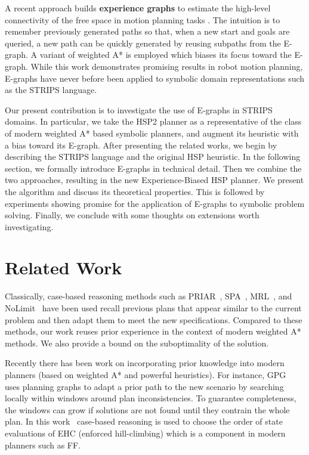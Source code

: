\documentclass[letterpaper]{article}
\begin{document}
A recent approach builds \textbf{experience graphs} to estimate the high-level connectivity of the free space in motion planning tasks \cite{phillips2012graphs}.
The intuition is to remember previously generated paths so that, when a new start and goals are queried, a new path can be quickly generated by reusing subpaths from the E-graph.
A variant of weighted A* is employed which biases its focus toward the E-graph.
While this work demonstrates promising results in robot motion planning, E-graphs have never before been applied to symbolic domain representations such as the STRIPS language.

Our present contribution is to investigate the use of E-graphs in STRIPS domains. In particular, we take the HSP2 planner \cite{bonet2001planning} as a representative of the class of modern weighted A* based symbolic planners, and augment its heuristic with a bias toward its E-graph. After presenting the related works, we begin by describing the STRIPS language and the original HSP heuristic. In the following section, we formally introduce E-graphs in technical detail. Then we combine the two approaches, resulting in the new Experience-Biased HSP planner. We present the algorithm and discuss its theoretical properties. This is followed by experiments showing promise for the application of E-graphs to symbolic problem solving. Finally, we conclude with some thoughts on extensions worth investigating.

\section{Related Work}

Classically, case-based reasoning methods 
such as PRIAR~\cite{Kamb:92}, SPA~\cite{Hank:95}, MRL~\cite{Koeh:94}, and NoLimit~\cite{mljournal}
have been used recall 
previous plans that appear similar to the current problem and 
then adapt them to meet the new specifications.
Compared to these methods, our work reuses prior experience in
the context of modern weighted A* methods. We also provide
a bound on the suboptimality of the solution. 

Recently there has been work on incorporating prior knowledge 
into modern planners (based on weighted A* and powerful heuristics).
For instance, GPG~\cite{Gere:00} uses planning graphs to adapt a prior path to the 
new scenario by searching locally within windows around plan 
inconsistencies. To guarantee completeness, the windows can grow 
if solutions are not found until they contrain the whole plan.
In this work~\cite{DBLP:conf/iccbr/RosaOB07} case-based reasoning is used to choose the 
order of state evaluations of EHC (enforced hill-climbing) which 
is a component in modern planners such as FF. 
\end{document}
